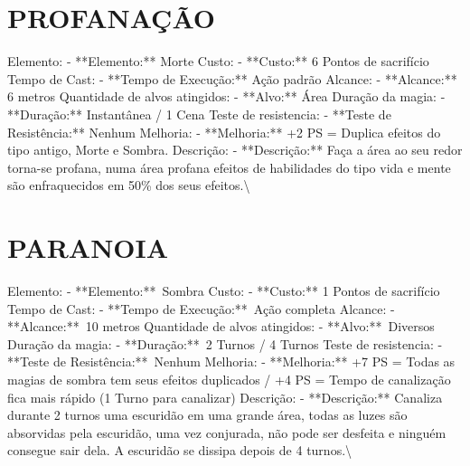 \documentclass{article}%
\begin{document}
\section{PROFANAÇÃO}%
\label{sec:PROFANAO}%
Elemento: {-} **Elemento:** Morte\newline%
Custo: {-} **Custo:** 6 Pontos de sacrifício\newline%
Tempo de Cast: {-} **Tempo de Execução:** Ação padrão\newline%
Alcance: {-} **Alcance:** 6 metros\newline%
Quantidade de alvos atingidos: {-} **Alvo:** Área\newline%
Duração da magia: {-} **Duração:** Instantânea / 1 Cena\newline%
Teste de resistencia: {-} **Teste de Resistência:** Nenhum\newline%
Melhoria: {-} **Melhoria:** +2 PS = Duplica efeitos do tipo antigo, Morte e Sombra.\newline%
Descrição: {-} **Descrição:** Faça a área ao seu redor torna{-}se profana, numa área profana efeitos de habilidades do tipo vida e mente são enfraquecidos em 50\% dos seus efeitos.\textbackslash{}

%
\section{PARANOIA}%
\label{sec:PARANOIA}%
Elemento: {-} **Elemento:**~Sombra\newline%
Custo: {-} **Custo:** 1 Pontos de sacrifício\newline%
Tempo de Cast: {-} **Tempo de Execução:**~Ação completa\newline%
Alcance: {-} **Alcance:**~10 metros\newline%
Quantidade de alvos atingidos: {-} **Alvo:**~Diversos\newline%
Duração da magia: {-} **Duração:**~2 Turnos / 4 Turnos\newline%
Teste de resistencia: {-} **Teste de Resistência:**~Nenhum\newline%
Melhoria: {-} **Melhoria:** +7 PS = Todas as magias de sombra tem seus efeitos duplicados / +4 PS = Tempo de canalização fica mais rápido (1 Turno para canalizar)\newline%
Descrição: {-} **Descrição:** Canaliza durante 2 turnos uma escuridão em uma grande área, todas as luzes são absorvidas pela escuridão, uma vez conjurada, não pode ser desfeita e ninguém consegue sair dela. A escuridão se dissipa depois de 4 turnos.\textbackslash{}
\end{document}
